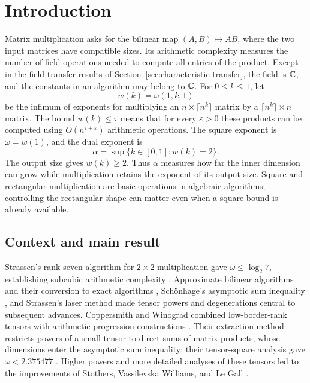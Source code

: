 \section{Introduction}\label{sec:introduction}

Matrix multiplication asks for the bilinear map \((A,B)\mapsto AB\),
where the two input matrices have compatible sizes.  Its arithmetic
complexity measures the number of field operations needed to compute
all entries of the product.  Except in the field-transfer results
of Section~\ref{sec:characteristic-transfer}, the field is \(\mathbb C\), and
the constants in an algorithm may belong to \(\mathbb C\).
For \(0\le k\le1\), let
\[
 w(k)=\omega(1,k,1)
\]
be the infimum of exponents for multiplying an
\(n\times\lceil n^k\rceil\) matrix by a
\(\lceil n^k\rceil\times n\) matrix.
The bound \(w(k)\le\tau\) means that for every \(\varepsilon>0\)
these products can be computed using \(O(n^{\tau+\varepsilon})\)
arithmetic operations.
The square exponent is \(\omega=w(1)\), and the dual exponent is
\[
 \alpha=\sup\{k\in[0,1]:w(k)=2\}.
\]
The output size gives \(w(k)\ge2\).  Thus \(\alpha\) measures how far
the inner dimension can grow while multiplication retains the exponent
of its output size.  Square and rectangular multiplication are basic
operations in algebraic algorithms; controlling the rectangular shape
can matter even when a square bound is already available.

\subsection{Context and main result}

Strassen's rank-seven algorithm for \(2\times2\) multiplication gave
\(\omega\le\log_2 7\), establishing subcubic arithmetic complexity
\cite{strassen}.  Approximate bilinear algorithms and their conversion
to exact algorithms \cite{bini}, Sch\"onhage's asymptotic sum inequality
\cite{schonhage}, and Strassen's laser method \cite{strassen-laser}
made tensor powers and degenerations central to subsequent advances.
Coppersmith and Winograd combined low-border-rank tensors with
arithmetic-progression constructions \cite{cw}.  Their extraction
method restricts powers of a small tensor to direct sums of matrix
products, whose dimensions enter the asymptotic sum inequality;
their tensor-square analysis gave \(\omega<2.375477\)
\cite[Section~8]{cw}.
Higher powers and more detailed analyses of these tensors
led to the improvements of Stothers, Vassilevska Williams, and Le Gall
\cite{stothers,williams-powers,legall-powers}.

